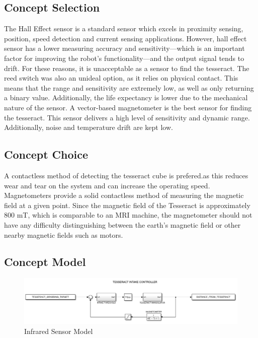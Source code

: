 \documentclass[12pt]{article}
\begin{document}
\subsection{Concept Selection}
The Hall Effect sensor is a standard sensor which excels in proximity sensing, position, speed detection and current sensing applications. However, hall effect sensor has a lower measuring accuracy and sensitivity—which is an important factor for improving the robot’s functionality—and the output signal tends to drift. For these reasons, it is unacceptable as a sensor to find the tesseract.
The reed switch was also an unideal option, as it relies on physical contact. This means that the range and sensitivity are extremely low, as well as only returning a binary value. Additionally, the life expectancy is lower due to the mechanical nature of the sensor.
A vector-based magnetometer is the best sensor for finding the tesseract. This sensor delivers a high level of sensitivity and dynamic range. Additionally, noise and temperature drift are kept low. 

\subsection{Concept Choice}
A contactless method of detecting the tesseract cube is prefered.as this reduces wear and tear on the system and can increase the operating speed. Magnetometers provide a solid contactless method of measuring the magnetic field at a given point. Since the magnetic field of the Tesseract is approximately 800 mT, which is comparable to an MRI machine, the magnetometer should not have any difficulty distinguishing between the earth’s magnetic field or other nearby magnetic fields such as motors.
\subsection{Concept Model}\begin{figure}[htb!]
\begin{center}
\includegraphics[scale=0.75]{Figures/simulink_tesseract}
\caption{Infrared Sensor Model}
\end{center}
\end{figure}
\FloatBarrier
\end{document}
